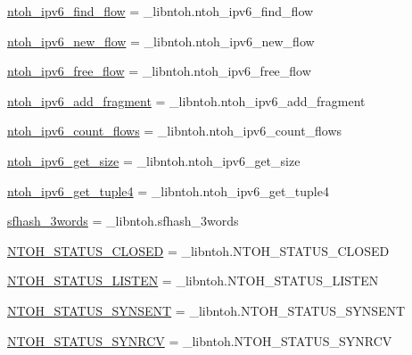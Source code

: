\begin{DoxyCompactItemize}
\item 
\hyperlink{namespacelibntoh_ad351882e21d38397f46fef12ded3b15b}{ntoh\-\_\-ipv6\-\_\-find\-\_\-flow} = \-\_\-libntoh.\-ntoh\-\_\-ipv6\-\_\-find\-\_\-flow
\item 
\hyperlink{namespacelibntoh_a9d97b5cc2c09d07f492699c41c7e62d8}{ntoh\-\_\-ipv6\-\_\-new\-\_\-flow} = \-\_\-libntoh.\-ntoh\-\_\-ipv6\-\_\-new\-\_\-flow
\item 
\hyperlink{namespacelibntoh_aa0644758f576c005e8f9c9d1f752a8a3}{ntoh\-\_\-ipv6\-\_\-free\-\_\-flow} = \-\_\-libntoh.\-ntoh\-\_\-ipv6\-\_\-free\-\_\-flow
\item 
\hyperlink{namespacelibntoh_a9bf97f1a23fcd3399abe29fc21833cf7}{ntoh\-\_\-ipv6\-\_\-add\-\_\-fragment} = \-\_\-libntoh.\-ntoh\-\_\-ipv6\-\_\-add\-\_\-fragment
\item 
\hyperlink{namespacelibntoh_aa09bcda8accf8797972c0d17a3370998}{ntoh\-\_\-ipv6\-\_\-count\-\_\-flows} = \-\_\-libntoh.\-ntoh\-\_\-ipv6\-\_\-count\-\_\-flows
\item 
\hyperlink{namespacelibntoh_aca1a2ad8eeb69af02e68c66254bf2e79}{ntoh\-\_\-ipv6\-\_\-get\-\_\-size} = \-\_\-libntoh.\-ntoh\-\_\-ipv6\-\_\-get\-\_\-size
\item 
\hyperlink{namespacelibntoh_ac126aa8798d2967cd7b07680e23375bc}{ntoh\-\_\-ipv6\-\_\-get\-\_\-tuple4} = \-\_\-libntoh.\-ntoh\-\_\-ipv6\-\_\-get\-\_\-tuple4
\item 
\hyperlink{namespacelibntoh_a25538745c5d8bb3a0ece1a9bfb486f56}{sfhash\-\_\-3words} = \-\_\-libntoh.\-sfhash\-\_\-3words
\item 
\hyperlink{namespacelibntoh_af0aabfe3b25028d6719e0640a1e91709}{N\-T\-O\-H\-\_\-\-S\-T\-A\-T\-U\-S\-\_\-\-C\-L\-O\-S\-E\-D} = \-\_\-libntoh.\-N\-T\-O\-H\-\_\-\-S\-T\-A\-T\-U\-S\-\_\-\-C\-L\-O\-S\-E\-D
\item 
\hyperlink{namespacelibntoh_a03bc4903c852d20a8e91c0f2f7e4e2cb}{N\-T\-O\-H\-\_\-\-S\-T\-A\-T\-U\-S\-\_\-\-L\-I\-S\-T\-E\-N} = \-\_\-libntoh.\-N\-T\-O\-H\-\_\-\-S\-T\-A\-T\-U\-S\-\_\-\-L\-I\-S\-T\-E\-N
\item 
\hyperlink{namespacelibntoh_a3e046fcebc165a94059138d1b8456249}{N\-T\-O\-H\-\_\-\-S\-T\-A\-T\-U\-S\-\_\-\-S\-Y\-N\-S\-E\-N\-T} = \-\_\-libntoh.\-N\-T\-O\-H\-\_\-\-S\-T\-A\-T\-U\-S\-\_\-\-S\-Y\-N\-S\-E\-N\-T
\item 
\hyperlink{namespacelibntoh_ae89777bf2240f0b838a500d5f092212f}{N\-T\-O\-H\-\_\-\-S\-T\-A\-T\-U\-S\-\_\-\-S\-Y\-N\-R\-C\-V} = \-\_\-libntoh.\-N\-T\-O\-H\-\_\-\-S\-T\-A\-T\-U\-S\-\_\-\-S\-Y\-N\-R\-C\-V
\item 

\end{DoxyCompactItemize}
